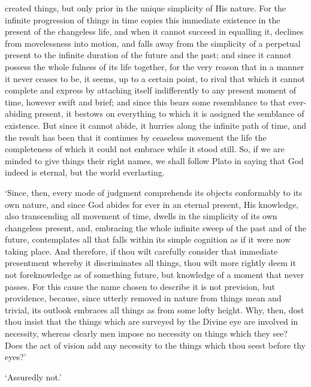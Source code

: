 \documentclass[11pt]{book}
\begin{document}
created things, but only prior in the unique simplicity of His nature.
For the infinite progression of things in time copies this immediate
existence in the present of the changeless life, and when it cannot
succeed in equalling it, declines from movelessness into motion, and
falls away from the simplicity of a perpetual present to the infinite
duration of the future and the past; and since it cannot possess the
whole fulness of its life together, for the very reason that in a manner
it never ceases to be, it seems, up to a certain point, to rival that
which it cannot complete and express by attaching itself indifferently
to any present moment of time, however swift and brief; and since this
bears some resemblance to that ever-abiding present, it bestows on
everything to which it is assigned the semblance of existence. But since
it cannot abide, it hurries along the infinite path of time, and the
result has been that it continues by ceaseless movement the life the
completeness of which it could not embrace while it stood still. So, if
we are minded to give things their right names, we shall follow Plato in
saying that God indeed is eternal, but the world everlasting.

`Since, then, every mode of judgment comprehends its objects conformably
to its own nature, and since God abides for ever in an eternal present,
His knowledge, also transcending all movement of time, dwells in the
simplicity of its own changeless present, and, embracing the whole
infinite sweep of the past and of the future, contemplates all that
falls within its simple cognition as if it were now taking place. And
therefore, if thou wilt carefully consider that immediate presentment
whereby it discriminates all things, thou wilt more rightly deem it not
foreknowledge as of something future, but knowledge of a moment that
never passes. For this cause the name chosen to describe it is not
prevision, but providence, because, since utterly removed in nature from
things mean and trivial, its outlook embraces all things as from some
lofty height. Why, then, dost thou insist that the things which are
surveyed by the Divine eye are involved in necessity, whereas clearly
men impose no necessity on things which they see? Does the act of vision
add any necessity to the things which thou seest before thy eyes?'

`Assuredly not.'
\end{document}
